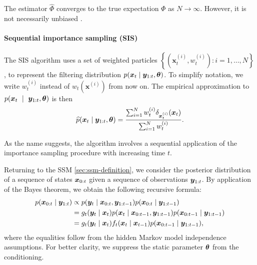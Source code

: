 The estimator $\widehat{\Phi}$ converges to the true expectation $\Phi$ as $N \to \infty$. However, it is not necessarily unbiased \citep{information-theory}.


\paragraph{Sequential importance sampling (SIS)}
The SIS algorithm uses a set of weighted particles $\left\{\left(\bm{x}_t^{(i)}, w_t^{(i)} \right) : i = 1, \ldots, N \right\}$, to represent the filtering distribution $p(\bm{x}_t \mid \bm{y}_{1:t}, \bm{\theta})$. To simplify notation, we write $w_t^{(i)}$ instead of $w_t(\bm{x}^{(i)})$ from now on. The empirical approximation to $p(\bm{x}_t~\mid~\bm{y}_{1:t}, \bm{\theta})$ is then
\begin{equation*}
\widehat{p}(\bm{x}_t \mid \bm{y}_{1:t}, \bm{\theta}) = \frac{\sum_{i=1}^N w_t^{(i)} \delta_{\bm{x}_t^{(i)}}(\bm{x}_t)}{\sum_{i=1}^N w_t^{(i)}}.
\end{equation*}

As the name suggests, the algorithm involves a sequential application of the importance sampling procedure with increasing time $t$.

Returning to the SSM \eqref{sec:ssm-definition}, we consider the posterior distribution of a sequence of states $\bm{x}_{0:t}$ given a sequence of observations $\bm{y}_{1:t}$. By application of the Bayes theorem, we obtain the following recursive formula:
\begin{equation*}
\begin{split}
p(\bm{x}_{0:t} \mid \bm{y}_{1:t}) & \propto p(\bm{y}_t \mid \bm{x}_{0:t}, \bm{y}_{1:t-1}) p(\bm{x}_{0:t} \mid \bm{y}_{1:t-1}) \\
&= g_t(\bm{y}_t \mid \bm{x}_t) p(\bm{x}_t \mid \bm{x}_{0:t-1}, \bm{y}_{1:t-1}) p(\bm{x}_{0:t-1} \mid \bm{y}_{1:t-1}) \\
&= g_t(\bm{y}_t \mid \bm{x}_t) f_t(\bm{x}_t \mid \bm{x}_{t-1}) p(\bm{x}_{0:t-1} \mid \bm{y}_{1:t-1}),
\end{split}
\end{equation*}
where the equalities follow from the hidden Markov model independence assumptions. For better clarity, we suppress the static parameter $\bm{\theta}$ from the conditioning.

